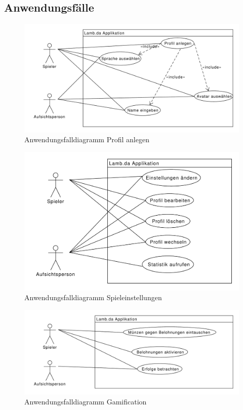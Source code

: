 \subsection{Anwendungsfälle}

\begin{figure}[H]
\centering
\includegraphics[scale=0.55]{../use_cases/create_profile.pdf}
\caption{Anwendungsfalldiagramm Profil anlegen}
\end{figure}

\begin{figure}[H]
\centering
\includegraphics[scale=0.55]{../use_cases/game_settings.pdf}
\caption{Anwendungsfalldiagramm Spieleinstellungen}
\end{figure}

\begin{figure}[H]
\centering
\includegraphics[scale=0.55]{../use_cases/gamification.pdf}
\caption{Anwendungsfalldiagramm Gamification}
\end{figure}


